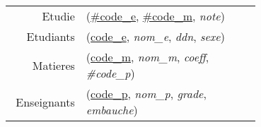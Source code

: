 
\usepackage[normalem]{ulem}
\newenvironment{mld}
  {\par\begin{minipage}{\linewidth}\begin{tabular}{rp{0.7\linewidth}}}
  {\end{tabular}\end{minipage}\par}
\newcommand{\relat}[1]{\textsc{#1}}
\newcommand{\attr}[1]{\emph{#1}}
\newcommand{\prim}[1]{\uline{#1}}
\newcommand{\foreign}[1]{\#\textsl{#1}}


\begin{mld}
  Etudie & (\prim{#code\_e}, \prim{#code\_m}, \attr{note})\\
  Etudiants & (\prim{code\_e}, \attr{nom\_e}, \attr{ddn}, \attr{sexe})\\
  Matieres & (\prim{code\_m}, \attr{nom\_m}, \attr{coeff}, \attr{#code\_p})\\
  Enseignants & (\prim{code\_p}, \attr{nom\_p}, \attr{grade}, \attr{embauche})\\
\end{mld}
